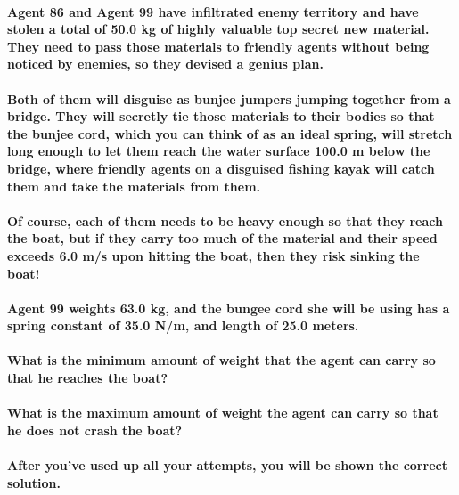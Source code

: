 \paragraph{Agent 86 and Agent 99 have inﬁltrated enemy territory and have stolen a total of 50.0 kg of highly valuable top secret new material. They need to pass those materials to friendly agents without being noticed by enemies, so they devised a genius plan.\newline}
\paragraph{Both of them will disguise as bunjee jumpers jumping together from a bridge. They will secretly tie those materials to their bodies so that the bunjee cord, which you can think of as an ideal spring, will stretch long enough to let them reach the water surface 100.0 m below the bridge, where friendly agents on a disguised ﬁshing kayak will catch them and take the materials from them.\newline}
\paragraph{Of course, each of them needs to be heavy enough so that they reach the boat, but if they carry too much of the material and their speed exceeds 6.0 m/s upon hitting the boat, then they risk sinking the boat!\newline}
\paragraph{Agent 99 weights 63.0 kg, and the bungee cord she will be using has a spring constant of 35.0 N/m, and length of 25.0 meters.\newline}
\paragraph{What is the minimum amount of weight that the agent can carry so that he reaches the boat? \newline}
\paragraph{What is the maximum amount of weight the agent can carry so that he does not crash the boat?\newline}
\paragraph{After you’ve used up all your attempts, you will be shown the correct solution. \newline}